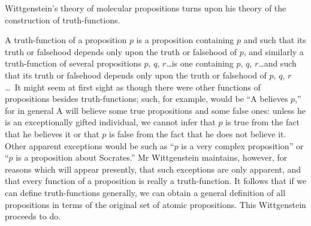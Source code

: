 Wittgenstein's theory of molecular propositions turns
upon his theory of the construction of truth-functions.

A truth-function of a proposition $p$ is a proposition
containing $p$ and such that its truth or falsehood depends
only upon the truth or falsehood of $p$, and similarly a
truth-function of several propositions $p$, $q$, $r$\ldots is one
containing $p$, $q$, $r$\ldots and such that its truth or falsehood
depends only upon the truth or falsehood of
$p$, $q$, $r$\ldots\ It might seem at first sight as though there
were other functions of propositions besides truth-functions;
such, for example, would be ``A believes $p$,'' for in general
A will believe some true propositions and some false
ones: unless he is an exceptionally gifted individual, we
cannot infer that $p$ is true from the fact that he believes
it or that $p$ is false from the fact that he does not believe
it. Other apparent exceptions would be such as ``$p$ is a
very complex proposition'' or ``$p$ is a proposition about
Socrates.'' Mr Wittgenstein maintains, however, for
reasons which will appear presently, that such exceptions
are only apparent, and that every function of a proposition
is really a truth-function. It follows that if we can
define truth-functions generally, we can obtain a general
definition of all propositions in terms of the original set
of atomic propositions. This Wittgenstein proceeds to
do.

